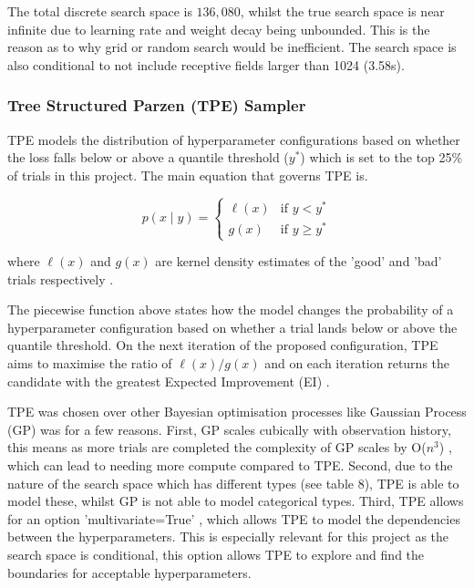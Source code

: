 The total discrete search space is $136,080$, whilst the true search space is near infinite due to learning rate and weight decay being unbounded. This
is the reason as to why grid or random search would be inefficient. The search space is also conditional to not include receptive fields larger than 1024
(3.58s).

\subsubsection{Tree Structured Parzen (TPE) Sampler}
TPE models the distribution of 
hyperparameter configurations based on whether the loss falls below or above a quantile threshold ($y^*$) which is set to 
the top 25\% of trials in this project. The main equation
that governs TPE is.

\begin{equation}
    p(x \mid y) =
    \begin{cases}
        \ell(x) & \text{if } y < y^* \\
        g(x)    & \text{if } y \geq y^*
    \end{cases}
\end{equation}

where $\ell(x)$ and $g(x)$ are kernel density estimates of the 'good' and 'bad' trials respectively \cite{NIPS2011_86e8f7ab}.

The piecewise function above states how the model changes the probability of a hyperparameter configuration based on whether a trial 
lands below or above the quantile threshold. On the next iteration of the proposed configuration, TPE aims to maximise the ratio of $\ell(x) / g(x)$ 
and on each iteration returns the candidate with the greatest Expected Improvement (EI) \cite{NIPS2011_86e8f7ab}.

TPE was chosen over other Bayesian optimisation processes like Gaussian Process (GP) was for a few reasons. First, GP scales 
cubically with observation history, this means as more trials are completed the complexity of GP scales by O($n^3$) \cite{NIPS2011_86e8f7ab}, which can lead
to needing more compute compared to TPE. Second, due to the nature of the search space which has different types (see table 8), TPE
is able to model these, whilst GP is not able to model categorical types. Third, TPE allows for an option 'multivariate=True' \cite{a2026_treestructured},
which allows TPE to model the dependencies between the hyperparameters. This is especially relevant for this project as the search space is 
conditional, this option allows TPE to explore and find the boundaries for acceptable hyperparameters.

